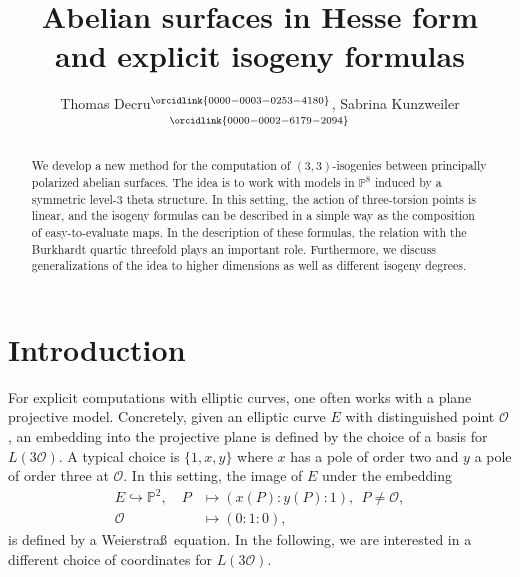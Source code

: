 \documentclass[11pt]{amsart}
\title{Abelian surfaces in Hesse form\\ and explicit isogeny formulas}
\author{Thomas Decru${}^{\orcidlink{0000-0003-0253-4180}}$, Sabrina Kunzweiler${}^{\orcidlink{0000-0002-6179-2094}}$}
\theoremstyle{definition}
\renewcommand{\O}{\mathcal{O}}
\newcommand{\PP}{\mathbb{P}}
\begin{document}
	\begin{abstract}
	We develop a new method for the computation of $(3,3)$-isogenies between principally polarized abelian surfaces. The idea is to work with models in $\PP^8$ induced by a symmetric level-$3$ theta structure. In this setting, the action of three-torsion points is linear, and the isogeny formulas can be described in a simple way as the composition of easy-to-evaluate maps. In the description of these formulas, the relation with the Burkhardt quartic threefold plays an important role. Furthermore, we discuss generalizations of the idea to higher dimensions as well as different isogeny degrees.
	\end{abstract}
	\maketitle
	
	
\section{Introduction}

For explicit computations with elliptic curves, one often works with a plane projective model. Concretely, given an elliptic curve $E$ with distinguished point $\O$, an embedding into the projective plane is defined by the choice of a basis for $L(3\O)$. A typical choice is $\{1,x,y\}$ where $x$ has a pole of order two and $y$ a pole of order three at $\O$. In this setting, the image of $E$ under the embedding
\begin{align*}
E \hookrightarrow \PP^2, \quad P &\mapsto (x(P):y(P):1), ~~ P \neq \O,\\
\O & \mapsto (0:1:0),
\end{align*}
is defined by a Weierstra\ss\ equation.
In the following, we are interested in a different choice of coordinates for $L(3\O)$. 
\end{document}
